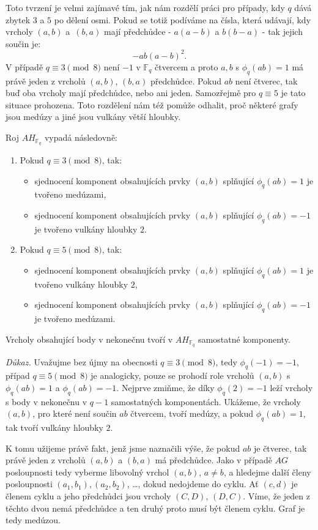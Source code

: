 \documentclass[12pt]{report}
\begin{document}
Toto tvrzení je velmi zajímavé tím, jak nám rozdělí práci pro případy, kdy $q$ dává zbytek $3$ a $5$ po dělení osmi. Pokud se totiž podíváme na čísla, která udávají, kdy vrcholy $(a,b)$ a~$(b,a)$ mají předchůdce - $a(a-b)$ a $b(b-a)$ - tak jejich součin je:
$$-ab (a-b)^2.$$  
V případě $q \equiv 3 \pmod{8}$ není $-1$ v $\mathbb{F}_q$ čtvercem a proto $a,b$ s $\phi_q (ab) = 1$ má právě jeden z vrcholů $(a,b)$, $(b,a)$ předchůdce. Pokud $ab$ není čtverec, tak buď oba vrcholy mají předchůdce, nebo ani jeden. Samozřejmě pro $q \equiv 5$ je tato situace prohozena. Toto rozdělení nám též pomůže odhalit, proč některé grafy jsou medúzy a jiné jsou vulkány větší hloubky.
\begin{veta}\label{big}
Roj $AH_{\mathbb{F}_q}$ vypadá následovně:
\begin{enumerate}
\item Pokud $q \equiv 3 \pmod{8}$, tak:
\begin{itemize}
\item sjednocení komponent obsahujících prvky $(a,b)$ splňující $\phi_q(ab) = 1$ je tvořeno medúzami,
\item sjednocení komponent obsahujících prvky $(a,b)$ splňující $\phi_q(ab) = -1$ je tvořeno vulkány hloubky $2$.
\end{itemize}
\item Pokud $q \equiv 5 \pmod{8}$, tak:
\begin{itemize}
\item sjednocení komponent obsahujících prvky $(a,b)$ splňující $\phi_q(ab) = 1$ je tvořeno vulkány hloubky $2$,
\item sjednocení komponent obsahujících prvky $(a,b)$ splňující $\phi_q(ab) = -1$ je tvořeno medúzami.
\end{itemize}
\end{enumerate}
Vrcholy obsahující body v nekonečnu tvoří v $AH_{\mathbb{F}_q}$ samostatné komponenty.
\end{veta}

\noindent \textit{Důkaz.} Uvažujme bez újmy na obecnosti $q \equiv 3 \pmod{8}$, tedy $\phi_q(-1)= -1$, případ $q \equiv 5 \pmod{8}$ je analogicky, pouze se prohodí role vrcholů $(a,b)$ s $\phi_q(ab) =1$ a $\phi_q(ab) = -1$. Nejprve zmiňme, že díky $\phi_q(2) = -1$ leží vrcholy s body v nekonečnu v $q-1$ samostatných komponentách. Ukážeme, že vrcholy $(a,b)$, pro které není součin $ab$ čtvercem, tvoří medúzy, a pokud $\phi_q (ab) = 1$, tak tvoří vulkány hloubky $2$. 

K tomu užijeme právě fakt, jenž jsme naznačili výše, že pokud $ab$ je čtverec, tak právě jeden z vrcholů $(a,b)$ a $(b,a)$ má předchůdce. Jako v případě $AG$ posloupnosti tedy vyberme libovolný vrchol $(a,b)$, $a \neq b$, a hledejme další členy posloupnosti $(a_1,b_1), (a_2,b_2)$, \dots, dokud nedojdeme do cyklu. Ať $(c,d)$ je členem cyklu a jeho předchůdci jsou vrcholy $(C,D)$, $(D,C)$. Víme, že jeden z těchto dvou nemá předchůdce a ten druhý proto musí být členem cyklu. Graf je tedy medúzou.
\end{document}
